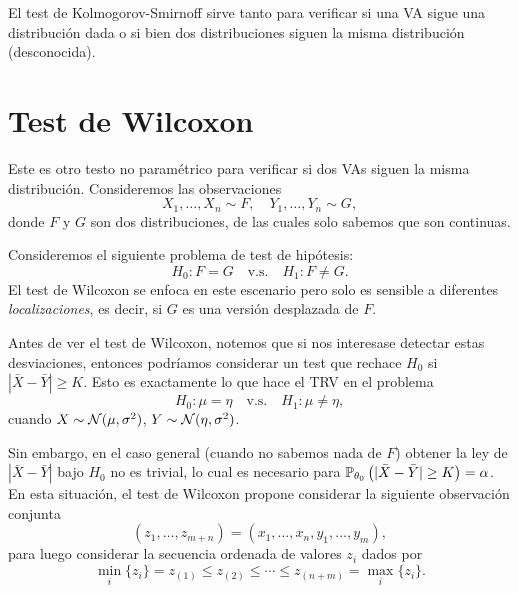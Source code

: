 \begin{remark}
El test de  Kolmogorov-Smirnoff sirve tanto para verificar si una VA sigue una distribución dada o si bien dos distribuciones siguen la misma distribución (desconocida).
\end{remark}

 \section{Test de Wilcoxon} 
\label{sub:test_Wilc}

Este es otro testo no paramétrico para verificar si dos VAs siguen la misma distribución. Consideremos las observaciones 
\begin{equation}
	X_1,\ldots,X_n\sim F,\quad Y_1,\ldots,Y_n\sim G,
\end{equation}
donde $F$ y $G$ son dos distribuciones, de las cuales solo sabemos que son continuas. 

Consideremos el siguiente problema de test de hipótesis: 
	\begin{equation}
		H_0:F=G\quad \text{v.s.}\quad H_1:F\neq G.
	\end{equation}
El test de Wilcoxon se enfoca en este escenario pero solo es sensible a diferentes \emph{localizaciones}, es decir, si $G$ es una versión desplazada de $F$.

Antes de ver el test de Wilcoxon, notemos que si nos interesase detectar estas desviaciones, entonces podríamos considerar un test que rechace $H_0$ si $|\bar{X} - \bar{Y}|\geq K$. Esto  es exactamente lo que hace el TRV en el problema 
	\begin{equation}
		H_0:\mu =  \eta \quad \text{v.s.}\quad H_1:\mu\neq \eta,
	\end{equation}
cuando $X\sim{\mathcal N}(\mu,\sigma^2)$,  $Y\sim{\mathcal N}(\eta,\sigma^2)$.

Sin embargo, en el caso general (cuando no sabemos nada de $F$) obtener la ley de $|\bar{X} - \bar{Y}|$ bajo $H_0$ no es trivial, lo cual es necesario para $\mathbb{P}_{\theta_0} \left(|\bar{X} - \bar{Y}|\geq K\right) = \alpha$. En esta situación, el test de Wilcoxon propone considerar la siguiente observación conjunta 
\begin{equation}
	(z_1,\ldots,z_{m+n}) = (x_1,\ldots,x_n,y_1,\ldots,y_m),
\end{equation}
para luego considerar la secuencia ordenada de valores $z_i$ dados por 
\begin{equation}
	\min_i\{z_i\} = z_{(1)}\leq z_{(2)}\leq\cdots\leq z_{(n+m)} = \max_i\{z_i\}.
\end{equation}

